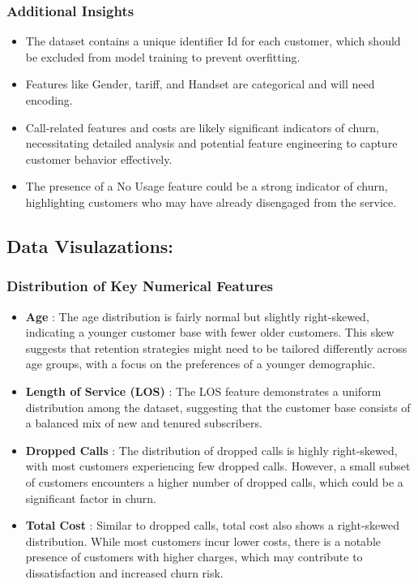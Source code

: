 \documentclass{article}
\begin{document}
\subsubsection{Additional Insights}
 
\begin{itemize}
    \item The dataset contains a unique identifier Id for each customer, which should be excluded from model training to prevent overfitting.
    \item Features like Gender, tariff, and Handset are categorical and will need encoding. 
    \item Call-related features and costs are likely significant indicators of churn, necessitating detailed analysis and potential feature engineering to capture customer behavior effectively.
    \item The presence of a No Usage feature could be a strong indicator of churn, highlighting customers who may have already disengaged from the service.
\end{itemize}


\subsection{Data Visulazations:}

\subsubsection{Distribution of Key Numerical Features}

\begin{itemize}
    \item \textbf{Age} : The age distribution is fairly normal but slightly right-skewed, indicating a younger customer base with fewer older customers. This skew suggests that retention strategies might need to be tailored differently across age groups, with a focus on the preferences of a younger demographic.

\item \textbf{Length of Service (LOS) }: The LOS feature demonstrates a uniform distribution among the dataset, suggesting that the customer base consists of a balanced mix of new and tenured subscribers.

\item \textbf{Dropped Calls }: The distribution of dropped calls is highly right-skewed, with most customers experiencing few dropped calls. However, a small subset of customers encounters a higher number of dropped calls, which could be a significant factor in churn.

\item \textbf{Total Cost }: Similar to dropped calls, total cost also shows a right-skewed distribution. While most customers incur lower costs, there is a notable presence of customers with higher charges, which may contribute to dissatisfaction and increased churn risk.
\end{itemize}
\end{document}
